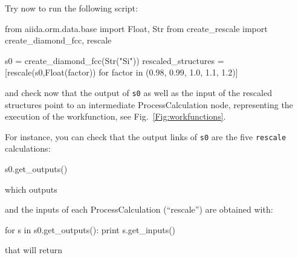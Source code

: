 \begin{tcolorbox}
Try now to run the following script:
\end{tcolorbox}
\begin{pythoncommand}
from aiida.orm.data.base import Float, Str
from create_rescale import create_diamond_fcc, rescale

s0 = create_diamond_fcc(Str("Si"))
rescaled_structures = [rescale(s0,Float(factor)) for factor in (0.98, 0.99, 1.0, 1.1, 1.2)]
\end{pythoncommand}
and check now that the output of \texttt{s0} as well as the input of the rescaled structures point to an intermediate ProcessCalculation node, representing the execution of the
workfunction, see Fig.~\ref{Fig:workfunctions}. 
\begin{tcolorbox}
For instance, you can check that the output links of \texttt{s0} are the five \texttt{rescale} calculations:
\end{tcolorbox}
\begin{pythoncommand}
s0.get_outputs()
\end{pythoncommand}
which outputs
\begin{pythoncommand}
\end{pythoncommand}
\begin{tcolorbox}
and the inputs of each ProcessCalculation (``rescale'') are obtained with:
\end{tcolorbox}
\begin{pythoncommand}
for s in s0.get_outputs():
     print s.get_inputs()
\end{pythoncommand}
that will return
\begin{pythoncommand}    
\end{pythoncommand}


